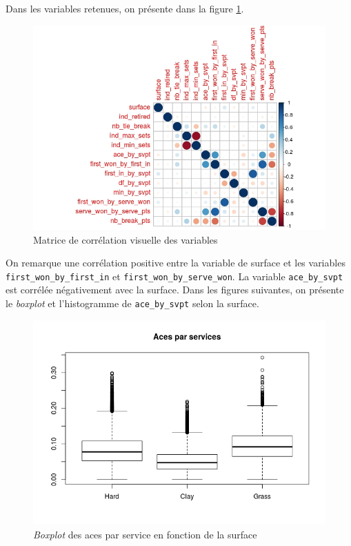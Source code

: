 Dans les variables retenues, on présente dans la figure \ref{fig:corrplot}.

\begin{figure}[H]
	\caption{Matrice de corrélation visuelle des variables}
	\label{fig:corrplot}
	\includegraphics[width=\textwidth]{corrplot}
\end{figure}

On remarque une corrélation positive entre la variable de surface et les variables \texttt{first\_won\_by\_first\_in} et \texttt{first\_won\_by\_serve\_won}. La variable \texttt{ace\_by\_svpt} est corrélée négativement avec la surface. Dans les figures suivantes, on présente le \textit{boxplot} et l'histogramme de \texttt{ace\_by\_svpt} selon la surface.

\begin{figure}[H]
	\caption{\textit{Boxplot} des aces par service en fonction de la surface}
	\label{fig:acebyserve}
	\includegraphics[width=\textwidth]{acevssurface}
\end{figure}

